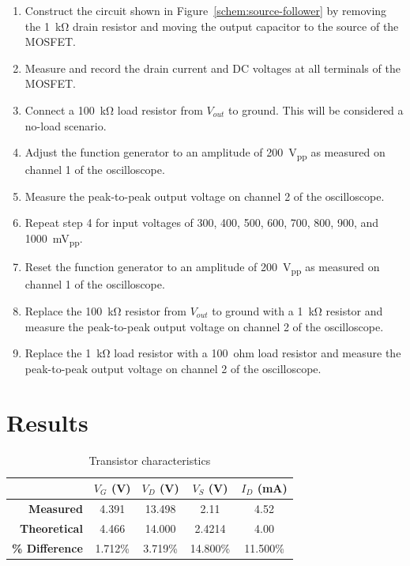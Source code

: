 \begin{enumerate}
\item Construct the circuit shown in Figure~\ref{schem:source-follower} by removing the \SI{1}{\kilo\ohm} drain resistor and moving the output capacitor to the source of the MOSFET.
\item Measure and record the drain current and DC voltages at all terminals of the MOSFET.
\item Connect a \SI{100}{\kilo\ohm} load resistor from $V_{out}$ to ground. This will be considered a no-load scenario.
\item Adjust the function generator to an amplitude of \SI{200}{V_{pp}} as measured on channel 1 of the oscilloscope.
\item Measure the peak-to-peak output voltage on channel 2 of the oscilloscope.
\item Repeat step 4 for input voltages of 300, 400, 500, 600, 700, 800, 900, and \SI{1000}{mV_{pp}}.
\item Reset the function generator to an amplitude of \SI{200}{V_{pp}} as measured on channel 1 of the oscilloscope.
\item Replace the \SI{100}{\kilo\ohm} resistor from $V_{out}$ to ground with a \SI{1}{\kilo\ohm} resistor and measure the peak-to-peak output voltage on channel 2 of the oscilloscope.
\item Replace the \SI{1}{\kilo\ohm} load resistor with a \SI{100}{ohm} load resistor and measure the peak-to-peak output voltage on channel 2 of the oscilloscope.
\end{enumerate}

\section{Results}


\begin{table}[hbtp]
  \centering
  \begin{tabular}{r|cccc}
                           & $V_{G}$ (\si{V}) & $V_{D}$ (\si{V}) & $V_{S}$ (\si{V}) & $I_D$ (\si{mA}) \\
    \hline
    \textbf{Measured}      & 4.391            & 13.498           & 2.11             & 4.52            \\
    \textbf{Theoretical}   & 4.466            & 14.000           & 2.4214           & 4.00            \\
    \textbf{\% Difference} & 1.712\%          & 3.719\%          & 14.800\%         & 11.500\%        \\
  \end{tabular}
  \caption{\label{tab:tran_common} Transistor characteristics}
\end{table}

